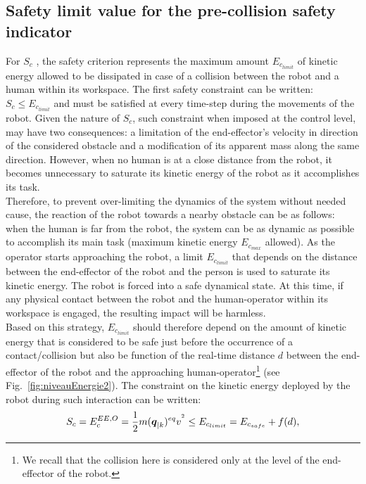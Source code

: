 \subsection{Safety limit value for the pre-collision safety indicator}
For $S_c$ , the safety criterion represents
the maximum amount $E_{c_{limit}}$ of kinetic energy allowed to be dissipated in case of a collision between the robot and a human within its workspace. The first safety constraint can be written: $S_c \leq E_{c_{limit}}$ and must be satisfied at every time-step during the movements of the robot. Given the nature of $S_c$, such constraint when imposed at the control level, may have two consequences: a limitation of the end-effector's velocity in direction of the considered obstacle and a modification of its apparent mass along the same direction. However, when no human is at a close distance from the robot, it becomes unnecessary to saturate its kinetic energy of the robot as it accomplishes its task. \\
Therefore, to prevent over-limiting the dynamics of
the system without needed cause, the reaction of the robot towards a nearby obstacle can be as follows: when the human is far from the robot, the system can be as dynamic as possible to accomplish its main task (maximum kinetic energy $E_{c_{max}}$ allowed). As the operator starts approaching the robot, a limit $E_{c_{limit}}$ that depends on the distance between the end-effector of the robot and the person is used to saturate its kinetic energy. The robot is forced into a safe dynamical state. At this time, if any physical contact between the robot and the human-operator within its workspace is engaged, the resulting impact will be harmless. \\
Based on this strategy, $E_{c_{limit}}$ should therefore depend on the amount of kinetic energy that is considered to be safe just before the occurrence of a contact/collision but also be function of the real-time distance $d$ between the end-effector of the robot and the approaching human-operator\footnote{We recall that the collision here is considered only at the level of the end-effector of the robot.} (see Fig.~\ref{fig:niveauEnergie2}). The constraint on the kinetic energy deployed by the robot during such interaction can be written:
\begin{equation}
S_c = E_{c}^{EE,O} = \frac{1}{2} m(\mbox{\boldmath${q}$}_{|k})^{eq} v^{^2} \leq E_{c_{limit}} = E_{c_{safe}} + f(d),
\label{eq:Ec_constr_a}
\end{equation} 
